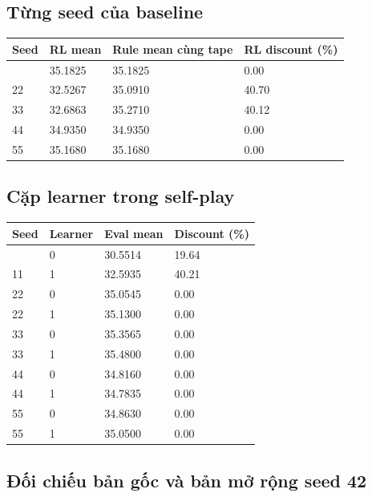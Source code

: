 \subsection{Từng seed của
baseline}\label{tux1eebng-seed-cux1ee7a-baseline}

{\def\LTcaptype{none} %
\begin{longtable}[]{@{}llll@{}}
\toprule\noalign{}
Seed & RL mean & Rule mean cùng tape & RL discount (\%) \\
\midrule\noalign{}
\endhead
\bottomrule\noalign{}
\endlastfoot
11 & 35.1825 & 35.1825 & 0.00 \\
22 & 32.5267 & 35.0910 & 40.70 \\
33 & 32.6863 & 35.2710 & 40.12 \\
44 & 34.9350 & 34.9350 & 0.00 \\
55 & 35.1680 & 35.1680 & 0.00 \\
\end{longtable}
}

\subsection{Cặp learner trong
self-play}\label{cux1eb7p-learner-trong-self-play}

{\def\LTcaptype{none} %
\begin{longtable}[]{@{}llll@{}}
\toprule\noalign{}
Seed & Learner & Eval mean & Discount (\%) \\
\midrule\noalign{}
\endhead
\bottomrule\noalign{}
\endlastfoot
11 & 0 & 30.5514 & 19.64 \\
11 & 1 & 32.5935 & 40.21 \\
22 & 0 & 35.0545 & 0.00 \\
22 & 1 & 35.1300 & 0.00 \\
33 & 0 & 35.3565 & 0.00 \\
33 & 1 & 35.4800 & 0.00 \\
44 & 0 & 34.8160 & 0.00 \\
44 & 1 & 34.7835 & 0.00 \\
55 & 0 & 34.8630 & 0.00 \\
55 & 1 & 35.0500 & 0.00 \\
\end{longtable}
}

\subsection{Đối chiếu bản gốc và bản mở rộng seed
42}\label{ux111ux1ed1i-chiux1ebfu-bux1ea3n-gux1ed1c-vuxe0-bux1ea3n-mux1edf-rux1ed9ng-seed-42}

